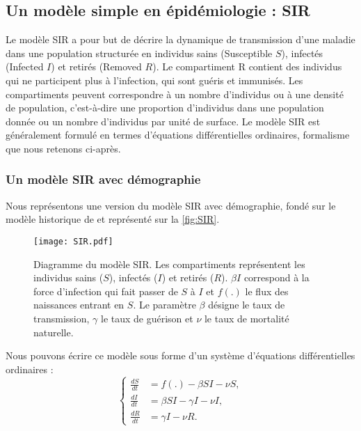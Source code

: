 	
	
\subsection{Un modèle simple en épidémiologie : SIR}
\label{sec:SIR}
	
	Le modèle SIR a pour  but  de décrire la dynamique de transmission d’une maladie dans une population structurée en individus sains  (\og Susceptible \fg{} $S$), infectés (\og Infected\fg{} $I$) et retirés (\og Removed \fg{} $R$). Le compartiment R contient des individus qui ne participent plus à l'infection, qui sont guéris et immunisés. 
Les compartiments peuvent correspondre à  un nombre d'individus ou à une densité de population, c'est-à-dire une proportion d'individus dans une population donnée ou un nombre d'individus par unité de surface. 
Le modèle SIR est généralement formulé en termes d'équations différentielles ordinaires, formalisme que nous retenons ci-après.
	
\subsubsection{Un modèle SIR avec démographie}
	
	Nous représentons une version du modèle SIR avec  démographie, fondé sur  le modèle historique de \citet{Kermack1932} et représenté sur la \autoref{fig:SIR}.
	
	\begin{figure}[ht]
	  \centering
	  \texttt{[image: SIR.pdf]}
	  \caption[Diagramme du modèle SIR]{Diagramme du modèle SIR. Les compartiments représentent les individus sains ($S 
	  $), infectés ($I$) et retirés ($R$). $\beta I$ correspond à la force d'infection qui fait passer de $S$ à $I$ et 
	  $f(.)$ le flux des naissances entrant en $S$. Le paramètre $\beta$ désigne le taux de transmission, $\gamma$ le 
	  taux de guérison et $\nu$ le taux de mortalité naturelle.}
	  \label{fig:SIR}
	\end{figure}
	
Nous pouvons écrire ce modèle sous forme d'un système d'équations différentielles ordinaires :
	\begin{equation}
	  \left\{
	    \begin{aligned}
	      \frac{dS}{dt} &= f(.) - \beta SI- \nu S,\\
	      \frac{dI}{dt} &= \beta SI - \gamma I - \nu  I, \\         
	      \frac{dR}{dt} &= \gamma I - \nu R.  
	    \end{aligned}
	  \right.
	  \label{eq:SIR}
	\end{equation}
	
